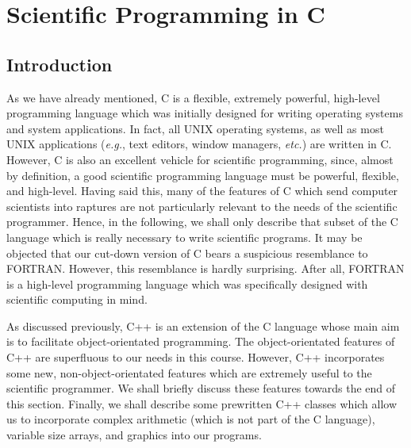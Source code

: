 \chapter{Scientific Programming in C}

\section{Introduction}
As we have already mentioned, C is a  flexible, extremely powerful, high-level programming language which was
initially designed for writing operating systems and  system applications. 
In fact, all UNIX operating systems, as well
as most UNIX applications ({\em e.g.}, text editors, window managers,
{\em etc.}) are written in C. However, C is also
an excellent vehicle for scientific programming, since, almost by definition,
a good scientific programming language must be powerful, flexible, and high-level.
Having said this, many of the features of C which send computer scientists into
raptures are not particularly relevant to the needs of the scientific programmer. 
Hence, in the following, we shall only describe  that subset of the C 
language which is
really necessary to write scientific programs. It may be objected that our cut-down version of C bears a suspicious resemblance
to FORTRAN.   However, this resemblance is hardly surprising. After all, FORTRAN is a high-level programming
language which was specifically designed with scientific computing in mind. 

As discussed previously, C++  is an extension of the C language whose main aim
is to facilitate object-orientated programming.
The object-orientated features of C++ are superfluous to our
needs in this course. However,  C++ incorporates some new, non-object-orientated features
which are extremely useful to the scientific programmer. We shall briefly discuss
these features towards the end of this section. Finally, we shall describe 
 some prewritten C++ classes which allow us to incorporate complex arithmetic
(which is not part of the C language), variable size arrays, and graphics into our programs.

